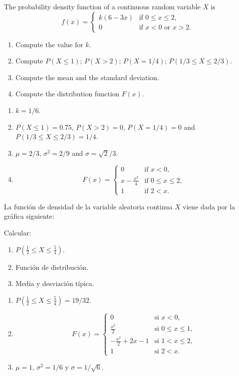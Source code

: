 
{The probability density function of a continuous random variable $X$ is 
\[
f(x)=
\begin{cases}
k(6-3x) & \mbox{if $0\leq x\leq 2$,} \\
0 & \mbox{if  $x<0$ or $x>2$.}
\end{cases}
\]
\begin{enumerate}
\item Compute the value for $k$.
\item Compute $P(X\leq 1)$; $P(X>2)$; $P(X=1/4)$; $P(1/3\leq X\leq 2/3)$.
\item Compute the mean and the standard deviation.
\item Compute the distribution function $F(x)$.
\end{enumerate}
}
{
\begin{enumerate}
\item $k=1/6$.
\item $P(X\leq 1)=0.75$, $P(X>2)=0$, $P(X=1/4)=0$ and $P(1/3\leq X\leq 2/3)=1/4$.
\item $\mu=2/3$, $\sigma^2=2/9$ and $\sigma=\sqrt{2}/3$.
\item \[
F(x)=
\begin{cases}
0 & \text{if $x<0$,}\\
x-\frac{x^2}{4} & \mbox{if $0\leq x\leq 2$,}\\
1 & \text{if $2<x$.}
\end{cases}
\]
\end{enumerate}
}
{}


{La función de densidad de la variable aleatoria continua $X$ viene dada por la gráfica siguiente:
\begin{center}
\scalebox{0.6}{}
\end{center}
Calcular:
\begin{enumerate}
\item $P(\frac{1}{2}\leq X\leq \frac{5}{4})$.
\item Función de distribución.
\item Media y desviación típica.
\end{enumerate}
}
{
\begin{enumerate}
\item $P(\frac{1}{2}\leq X\leq \frac{5}{4})=19/32$.
\item \[
F(x)=
\begin{cases}
0 & \text{si $x<0$,}\\
\frac{x^2}{2} & \text{si $0\leq x\leq 1$,}\\
-\frac{x^2}{2}+2x-1 & \text{si $1<x\leq 2$,}\\
1 & \text{si $2<x$.}
\end{cases}
\]
\item $\mu=1$, $\sigma^2=1/6$ y $\sigma=1/\sqrt{6}$.
\end{enumerate}
}
{}


